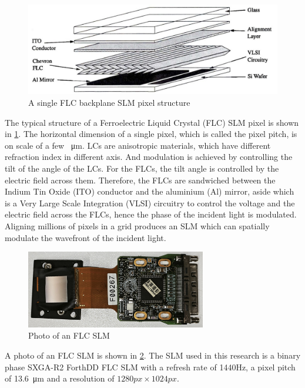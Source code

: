 \begin{figure}[H]
  \centering
  \includegraphics[width=1.0\textwidth]{SLM_pixel_structure.jpg}
  \caption{A single FLC backplane SLM pixel structure \cite{Wilkinson1994}} \label{fig:SLM_pixel_structure}
\end{figure}

The typical structure of a Ferroelectric Liquid Crystal (FLC) SLM pixel is shown in \cref{fig:SLM_pixel_structure}. The horizontal dimension of a single pixel, which is called the pixel pitch, is on scale of a few \SI{}{\micro\metre}. LCs are anisotropic materials, which have different refraction index in different axis. And modulation is achieved by controlling the tilt of the angle of the LCs. For the FLCs, the tilt angle is controlled by the electric field across them. Therefore, the FLCs are sandwiched between the Indium Tin Oxide (ITO) conductor and the aluminium (Al) mirror, aside which is a Very Large Scale Integration (VLSI) circuitry to control the voltage and the electric field across the FLCs, hence the phase of the incident light is modulated. Aligning millions of pixels in a grid produces an SLM which can spatially modulate the wavefront of the incident light.
\begin{figure}[H]
  \centering
  \includegraphics[width=0.7\textwidth]{SLMPhoto.jpg}
  \caption{Photo of an FLC SLM} \label{fig:SLMPhoto}
\end{figure}
A photo of an FLC SLM is shown in \cref{fig:SLMPhoto}. The SLM used in this research is a binary phase SXGA-R2 ForthDD FLC SLM with a refresh rate of 1440Hz, a pixel pitch of \SI{13.6}{\micro\metre} and a resolution of $1280px \times 1024px$.

